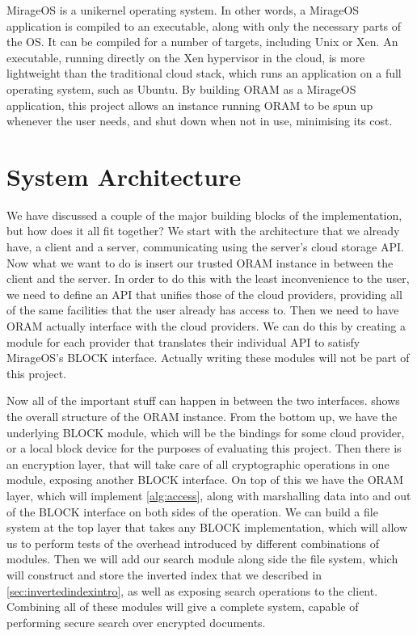 \documentclass[12pt,a4paper,twoside,openright]{report}
\begin{document}
MirageOS is a unikernel operating system. In other words, a MirageOS application is compiled to an executable, along with only the necessary parts of the OS. It can be compiled for a number of targets, including Unix or Xen. An executable, running directly on the Xen hypervisor in the cloud, is more lightweight than the traditional cloud stack, which runs an application on a full operating system, such as Ubuntu. By building ORAM as a MirageOS application, this project allows an instance running ORAM to be spun up whenever the user needs, and shut down when not in use, minimising its cost.

\section{System Architecture}

\setlength{\unitlength}{0.75mm}

\setlength{\unitlength}{0.5mm}

We have discussed a couple of the major building blocks of the implementation, but how does it all fit together? We start with the architecture that we already have, a client and a server, communicating using the server's cloud storage API. Now what we want to do is insert our trusted ORAM instance in between the client and the server. In order to do this with the least inconvenience to the user, we need to define an API that unifies those of the cloud providers, providing all of the same facilities that the user already has access to. Then we need to have ORAM actually interface with the cloud providers. We can do this by creating a module for each provider that translates their individual API to satisfy MirageOS's BLOCK interface. Actually writing these modules will not be part of this project.

Now all of the important stuff can happen in between the two interfaces.  shows the overall structure of the ORAM instance. From the bottom up, we have the underlying BLOCK module, which will be the bindings for some cloud provider, or a local block device for the purposes of evaluating this project. Then there is an encryption layer, that will take care of all cryptographic operations in one module, exposing another BLOCK interface. On top of this we have the ORAM layer, which will implement \cref{alg:access}, along with marshalling data into and out of the BLOCK interface on both sides of the operation. We can build a file system at the top layer that takes any BLOCK implementation, which will allow us to perform tests of the overhead introduced by different combinations of modules. Then we will add our search module along side the file system, which will construct and store the inverted index that we described in \cref{sec:invertedindexintro}, as well as exposing search operations to the client. Combining all of these modules will give a complete system, capable of performing secure search over encrypted documents.
\end{document}
